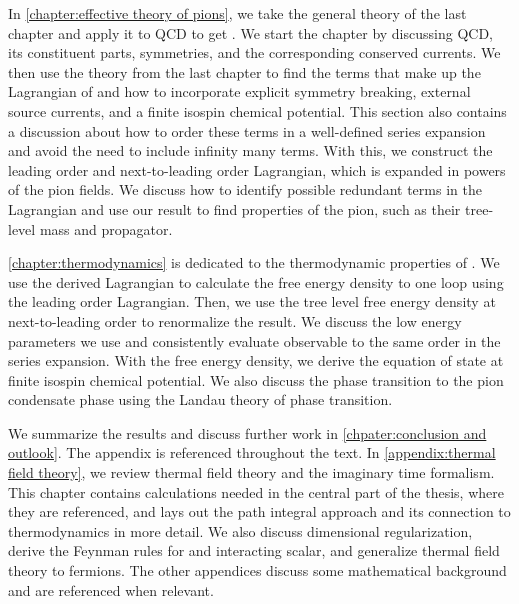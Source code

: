 In \autoref{chapter:effective theory of pions}, we take the general theory of the last chapter and apply it to QCD to get \chpt.
We start the chapter by discussing QCD, its constituent parts, symmetries, and the corresponding conserved currents.
We then use the theory from the last chapter to find the terms that make up the Lagrangian of \chpt and how to incorporate explicit symmetry breaking, external source currents, and a finite isospin chemical potential.
This section also contains a discussion about how to order these terms in a well-defined series expansion and avoid the need to include infinity many terms.
With this, we construct the leading order and next-to-leading order Lagrangian, which is expanded in powers of the pion fields.
We discuss how to identify possible redundant terms in the Lagrangian and use our result to find properties of the pion, such as their tree-level mass and propagator.

\cref{chapter:thermodynamics} is dedicated to the thermodynamic properties of \chpt.
We use the derived Lagrangian to calculate the free energy density to one loop using the leading order Lagrangian.
Then, we use the tree level free energy density at next-to-leading order to renormalize the result.
We discuss the low energy parameters we use and consistently evaluate observable to the same order in the series expansion.
With the free energy density, we derive the equation of state at finite isospin chemical potential.
We also discuss the phase transition to the pion condensate phase using the Landau theory of phase transition.

We summarize the results and discuss further work in \autoref{chpater:conclusion and outlook}.
The appendix is referenced throughout the text.
In \autoref{appendix:thermal field theory}, we review thermal field theory and the imaginary time formalism.
This chapter contains calculations needed in the central part of the thesis, where they are referenced, and lays out the path integral approach and its connection to thermodynamics in more detail.
We also discuss dimensional regularization, derive the Feynman rules for and interacting scalar, and generalize thermal field theory to fermions.
The other appendices discuss some mathematical background and are referenced when relevant.
